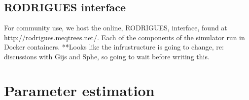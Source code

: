 \subsection{RODRIGUES interface}
For community use, we host the online, RODRIGUES, interface, found at http://rodrigues.meqtrees.net/. Each of the components of the simulator run in Docker containers. **Looks like the infrustructure is going to change, re: discussions with Gijs and Sphe, so going to wait before writing this.

\section{Parameter estimation}

